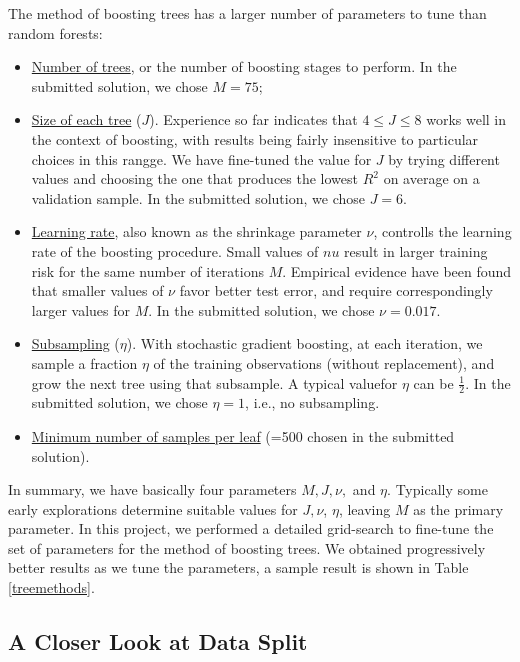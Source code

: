 \documentclass[
11pt, %
a4paper, %
oneside, %
headinclude,footinclude, %
BCOR5mm, %
]{scrartcl}
\begin{document}
The method of boosting trees has a larger number of parameters to tune than random forests:
\begin{itemize}[noitemsep]
	\item \underline{Number of trees}, or the number of boosting stages to perform. In the submitted solution, we chose $M=75$;
	\item \underline{Size of each tree} ($J$). Experience so far indicates that $4\le J\le 8$ works well in the context of boosting, with results being fairly
	insensitive to particular choices in this rangge. We have fine-tuned the value for $J$ by trying different values and choosing the one that produces
	the lowest $R^2$ on average on a validation sample. In the submitted solution, we chose $J=6$.
	\item \underline{Learning rate}, also known as the shrinkage parameter $\nu$, controlls the learning rate of the boosting procedure. Small values of $nu$ result in larger
	training risk for the same number of iterations $M$. Empirical evidence have been found that smaller values of $\nu$ favor better test error, and require correspondingly larger values for $M$. In the submitted solution, we chose $\nu=0.017$.
	\item \underline{Subsampling} ($\eta$). With stochastic gradient boosting, at each iteration, we sample a fraction $\eta$ of the training observations (without replacement), and grow the next tree using that subsample. A typical valuefor $\eta$ can be $\frac{1}{2}$. In the submitted solution, we chose $\eta=1$, i.e., no subsampling.
	\item \underline{Minimum number of samples per leaf} (=500 chosen in the submitted solution).
\end{itemize}
In summary, we have basically four parameters $M,J,\nu,$ and $\eta$. Typically some early explorations determine suitable values for $J,\nu$, $\eta$, leaving $M$ as the primary parameter. In this project, we performed a detailed grid-search to fine-tune the set of parameters for the method of boosting trees. We obtained progressively better results as we tune the parameters, a sample result is shown in Table \ref{treemethods}.


\subsection{A Closer Look at Data Split}
\end{document}
